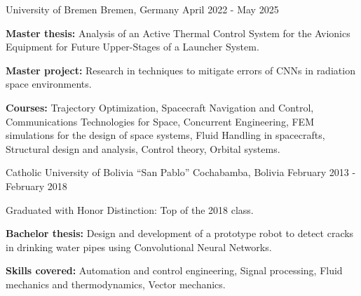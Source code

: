 
\begin{cventries}
  {University of Bremen}
  {Bremen, Germany}
  {April 2022 - May 2025}
  {%
    \begin{cvitems}
      \item \textbf{Master thesis:} Analysis of an Active Thermal
      Control System for the Avionics Equipment for Future
      Upper-Stages of a Launcher System.
      \item \textbf{Master project:} Research in techniques to
      mitigate errors of CNNs in radiation space environments.
      \item \textbf{Courses:} Trajectory Optimization, Spacecraft
      Navigation and Control, Communications Technologies for Space,
      Concurrent Engineering, FEM simulations for the design of space
      systems, Fluid Handling in spacecrafts, Structural design and
      analysis, Control theory, Orbital systems.
    \end{cvitems}
  }

  {Catholic University of Bolivia ``San Pablo''}
  {Cochabamba, Bolivia}
  {February 2013 - February 2018}
  {
    \begin{cvitems}
      \item Graduated with Honor Distinction: Top of the 2018 class.
      \item \textbf{Bachelor thesis:} Design and development of a
      prototype robot to detect cracks in drinking water
      pipes using Convolutional Neural Networks.
      \item \textbf{Skills covered:} Automation and control
      engineering, Signal processing, Fluid mechanics and
      thermodynamics, Vector mechanics.
    \end{cvitems}
  }

\end{cventries}
